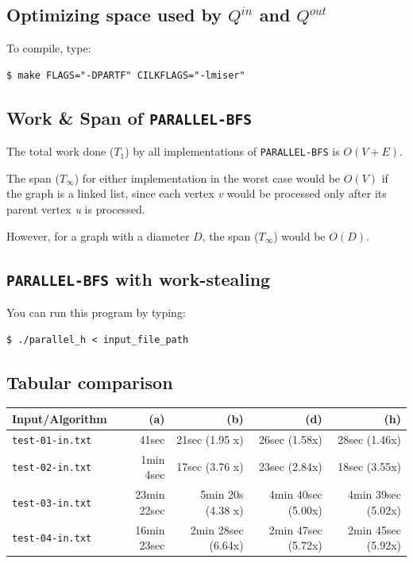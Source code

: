 \documentclass{article}
\begin{document}
\subsection{Optimizing space used by $Q^{in}$ and $Q^{out}$}

To compile, type:
\begin{verbatim}
$ make FLAGS="-DPARTF" CILKFLAGS="-lmiser"
\end{verbatim}

\subsection{Work \& Span of \texttt{PARALLEL-BFS}}

The total work done ($T_1$) by all implementations of
\texttt{PARALLEL-BFS} is $O(V + E)$.

The span ($T_\infty$) for either implementation in the worst case
would be $O(V)$ if the graph is a linked list, since each vertex
\textit{v} would be processed only after its parent vertex \textit{u}
is processed.

However, for a graph with a diameter $D$, the span ($T_\infty$) would
be $O(D)$.

\subsection{\texttt{PARALLEL-BFS} with work-stealing}

You can run this program by typing:
\begin{verbatim}
$ ./parallel_h < input_file_path
\end{verbatim}

\subsection{Tabular comparison}

\begin{center}
  \begin{tabular}{| l | r | r | r | r |}
    \hline
    Input/Algorithm & (a) & (b) & (d) & (h) \\ \hline
    \texttt{test-01-in.txt} & 41sec & 21sec (1.95 x) & 26sec (1.58x) & 28sec (1.46x) \\ \hline
    \texttt{test-02-in.txt} & 1min 4sec & 17sec (3.76 x) & 23sec (2.84x) & 18sec (3.55x) \\ \hline
    \texttt{test-03-in.txt} & 23min 22sec & 5min 20s (4.38 x) & 4min 40sec (5.00x) & 4min 39sec (5.02x) \\ \hline
    \texttt{test-04-in.txt} & 16min 23sec & 2min 28sec (6.64x) & 2min 47sec (5.72x) & 2min 45sec (5.92x) \\
    \hline
  \end{tabular}
\end{center}
\end{document}
